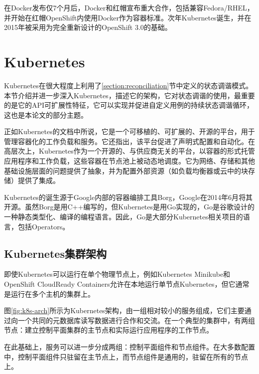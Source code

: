 \documentclass[macfonts,master]{njuthesis}
\begin{document}
在Docker发布仅7个月后，Docker和红帽宣布重大合作，包括兼容Fedora/RHEL，并开始在红帽OpenShift内使用Docker作为容器标准\cite{dockerredhat}。次年Kubernetes诞生，并在2015年被采用为完全重新设计的OpenShift 3.0的基础\cite{openshiftk8s}。

\section{Kubernetes}

Kubernetes在很大程度上利用了\ref{section:reconciliation}节中定义的状态调谐模式。本节介绍并进一步深入Kubernetes，描述它的架构，它对状态调谐的使用，最重要的是它的API可扩展性特征，它可以实现并促进自定义用例的持续状态调谐循环，这也是本论文的部分主题。

正如Kubernetes的文档中所说，它是一个可移植的、可扩展的、开源的平台，用于管理容器化的工作负载和服务。它还指出，该平台促进了声明式配置和自动化\cite{whatisk8s}。在高层次上，Kubernetes作为一个开源的、与供应商无关的平台，以容器的形式托管应用程序和工作负载，这些容器在节点池上被动态地调度。它为网络、存储和其他基础设施层面的问题提供了抽象，并为配置外部资源（如负载均衡器或云中的块存储）提供了集成。

Kubernetes的诞生源于Google内部的容器编排工具Borg，Google在2014年6月\cite{googleopen}将其开源\cite{k8sorigin}。虽然Borg是用C++编写的，但Kubernetes是用Go实现的，Go是谷歌设计的一种静态类型化、编译的编程语言。因此，Go是大部分Kubernetes相关项目的语言，包括Operators。


\subsection{Kubernetes集群架构}
即使Kubernetes可以运行在单个物理节点上，例如Kubernetes Minikube和OpenShift CloudReady Containers允许在本地运行单节点Kubernetes，但它通常是运行在多个主机的集群上。

图\ref{fig:k8s-arch}所示为Kubernetes架构，由一组相对较小的服务组成，它们主要通过向一个共同的元数据库读写数据进行合作和交流。在一个典型的集群中，有两组节点：建立控制平面集群的主节点和实际运行应用程序的工作节点。

在此基础上，服务可以进一步分成两组：控制平面组件和节点组件。在大多数配置中，控制平面组件只驻留在主节点上，而节点组件是通用的，驻留在所有的节点上\cite{k8scomponents}。
\end{document}
